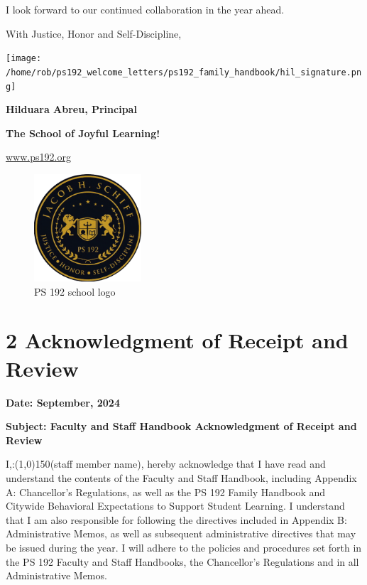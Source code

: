 \documentclass[11pt]{article}
\begin{document}
I look forward to our continued collaboration in the year ahead.

With Justice, Honor and Self-Discipline,

\texttt{[image: /home/rob/ps192\_welcome\_letters/ps192\_family\_handbook/hil\_signature.png]}

\textbf{\textbf{Hilduara Abreu, Principal}}

\textbf{\textbf{The School of Joyful Learning!}}

\href{https://www.ps192.org}{www.ps192.org}

\begin{figure}[b]
\begin{center}
\includegraphics[width=40mm,scale=0.3]{ps192.png}
\caption{PS 192 school logo}
\label{fig:school_logo}
\end{center}
\end{figure}

\clearpage

\section{2 Acknowledgment of Receipt and Review}
\label{sec:orge7f493e}

\textbf{Date: September, 2024}

\textbf{Subject: Faculty and Staff Handbook Acknowledgment of Receipt and Review}
\vspace*{1cm}

I,:\line(1,0){150}(staff member name), hereby acknowledge that I have read and understand the contents of the  Faculty and Staff Handbook, including Appendix A: Chancellor’s Regulations, as well as the PS 192  Family Handbook and Citywide Behavioral Expectations to Support Student Learning.  I understand that I am also responsible for following the directives included in Appendix B: Administrative Memos, as well as subsequent administrative directives that may be issued during the year. I will adhere to the policies and procedures set forth in the PS 192 Faculty and Staff  Handbooks, the Chancellor’s Regulations and in all Administrative Memos.
\end{document}
